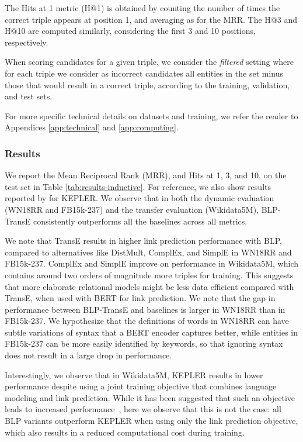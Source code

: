 \documentclass[sigconf]{acmart}
\begin{document}
The Hits at 1 metric (H@1) is obtained by counting the number of times the correct triple appears at position 1, and averaging as for the MRR. The H@3 and H@10 are computed similarly, considering the first 3 and 10 positions, respectively.

When scoring candidates for a given triple, we consider the \textit{filtered} setting \citep{bordes2013translating} where for each triple we consider as incorrect candidates all entities in the set  minus those that would result in a correct triple, according to the training, validation, and test sets.

For more specific technical details on datasets and training, we refer the reader to Appendices \ref{app:technical} and \ref{app:computing}.

\subsubsection{Results}

We report the Mean Reciprocal Rank (MRR), and Hits at 1, 3, and 10, on the test set in Table \ref{tab:results-inductive}. For reference, we also show results reported by \citet{wang2019kepler} for KEPLER. We observe that in both the dynamic evaluation (WN18RR and FB15k-237) and the transfer evaluation (Wikidata5M), BLP-TransE consistently outperforms all the baselines across all metrics.

We note that TransE results in higher link prediction performance with BLP, compared to alternatives like DistMult, ComplEx, and SimplE in WN18RR and FB15k-237. ComplEx and SimplE improve on performance in Wikidata5M, which contains around two orders of magnitude more triples for training. This suggests that more elaborate relational models might be less data efficient compared with TransE, when used with BERT for link prediction. We note that the gap in performance between BLP-TransE and baselines is larger in WN18RR than in FB15k-237. We hypothesize that the definitions of words in WN18RR can have subtle variations of syntax that a BERT encoder captures better, while entities in FB15k-237 can be more easily identified by keywords, so that ignoring syntax does not result in a large drop in performance.

Interestingly, we observe that in Wikidata5M, KEPLER results in lower performance despite using a joint training objective that combines language modeling and link prediction. While it has been suggested that such an objective leads to increased performance~\cite{wang2019kepler}, here we observe that this is not the case: all BLP variants outperform KEPLER when using only the link prediction objective, which also results in a reduced computational cost during training.
\end{document}
